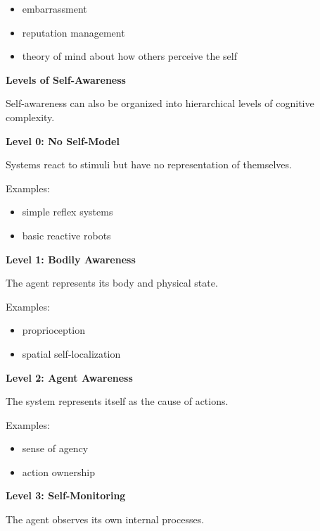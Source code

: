 \documentclass{book}
\providecommand{\ProjectDeepHeading}[2]{%
    \par\medskip\noindent\textbf{#2}\par\smallskip
}
\begin{document}
         \begin{itemize}
            \item embarrassment
            \item reputation management
            \item theory of mind about how others perceive the self
         \end{itemize}


   \ProjectDeepHeading{7}{Levels of Self-Awareness}

      Self-awareness can also be organized into hierarchical levels of cognitive complexity.

      \ProjectDeepHeading{8}{Level 0: No Self-Model}

         Systems react to stimuli but have no representation of themselves.

         Examples:

         \begin{itemize}
            \item simple reflex systems
            \item basic reactive robots
         \end{itemize}

      \ProjectDeepHeading{8}{Level 1: Bodily Awareness}

         The agent represents its body and physical state.

         Examples:

         \begin{itemize}
            \item proprioception
            \item spatial self-localization
         \end{itemize}

      \ProjectDeepHeading{8}{Level 2: Agent Awareness}

         The system represents itself as the cause of actions.

         Examples:

         \begin{itemize}
            \item sense of agency
            \item action ownership
         \end{itemize}

      \ProjectDeepHeading{8}{Level 3: Self-Monitoring}

         The agent observes its own internal processes.
\end{document}

